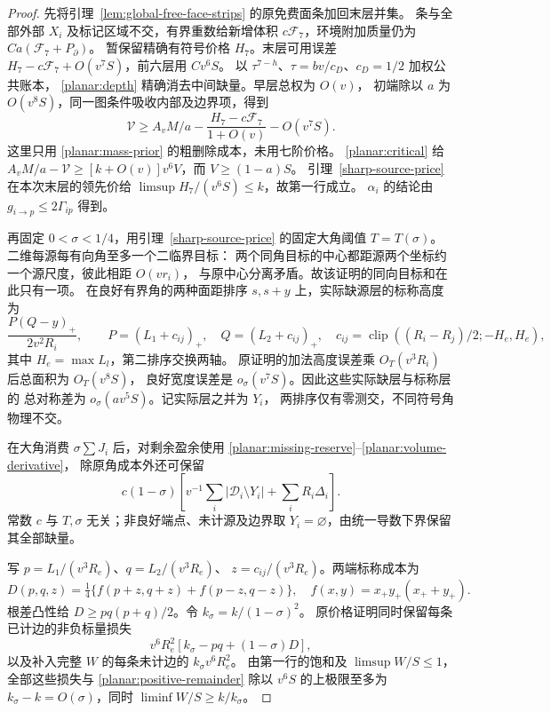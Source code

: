 \begin{proof}
先将引理~\ref{lem:global-free-face-strips} 的原免费面条加回末层并集。
条与全部外部 \(X_i\) 及标记区域不交，有界重数给新增体积
\(c\mathcal F_7\)，环境附加质量仍为 \(Ca(\mathcal F_7+P_\partial)\)。
暂保留精确有符号价格 \(H_7\)。末层可用误差
\(H_7-c\mathcal F_7+O(v^7S)\)，前六层用 \(Cv^6S\)。
以 \(\tau^{7-h}\)、\(\tau=bv/c_D\)、\(c_D=1/2\) 加权公共账本，
\eqref{planar:depth} 精确消去中间缺量。早层总权为 \(O(v)\)，
初端除以 \(a\) 为 \(O(v^8S)\)，同一图条件吸收内部及边界项，得到
\[
 \mathcal V\ge A_vM/a-
   \frac{H_7-c\mathcal F_7}{1+O(v)}-O(v^7S).
\]
这里只用 \eqref{planar:mass-prior} 的粗删除成本，未用七阶价格。
\eqref{planar:critical} 给
\(A_vM/a-\mathcal V\ge[k+O(v)]v^6V\)，而 \(V\ge(1-a)S\)。
引理~\ref{sharp-source-price} 在本次末层的领先价给
\(\limsup H_7/(v^6S)\le k\)，故第一行成立。
\(\alpha_i\) 的结论由 \(g_{i\to p}\le2\Gamma_{ip}\) 得到。

再固定 \(0<\sigma<1/4\)，用引理~\ref{sharp-source-price} 的固定大角阈值
\(T=T(\sigma)\)。二维每源每有向角至多一个二临界目标：
两个同角目标的中心都距源两个坐标约一个源尺度，彼此相距 \(O(vr_i)\)，
与原中心分离矛盾。故该证明的同向目标和在此只有一项。
在良好有界角的两种面距排序 \(s,s+y\) 上，实际缺源层的标称高度为
\[
 \frac{P(Q-y)_+}{2v^2R_i},\qquad
 P=(L_1+c_{ij})_+,\quad Q=(L_2+c_{ij})_+,\quad
 c_{ij}=\operatorname{clip}((R_i-R_j)/2; -H_e,H_e),
\]
其中 \(H_e=\max L_l\)，第二排序交换两轴。
原证明的加法高度误差乘 \(O_T(v^3R_i)\) 后总面积为 \(O_T(v^8S)\)，
良好宽度误差是 \(o_\sigma(v^7S)\)。因此这些实际缺层与标称层的
总对称差为 \(o_\sigma(av^5S)\)。记实际层之并为 \(Y_i\)，
两排序仅有零测交，不同符号角物理不交。

在大角消费 \(\sigma\sum J_i\) 后，对剩余盈余使用
\eqref{planar:missing-reserve}--\eqref{planar:volume-derivative}，
除原角成本外还可保留
\begin{equation}\label{planar:positive-remainder}
 c(1-\sigma)\left[
 v^{-1}\sum_i|\mathscr D_i\setminus Y_i|+\sum_iR_i\Delta_i\right].
\end{equation}
常数 \(c\) 与 \(T,\sigma\) 无关；非良好端点、未计源及边界取
\(Y_i=\varnothing\)，由统一导数下界保留其全部缺量。

写 \(p=L_1/(v^3R_e)\)、\(q=L_2/(v^3R_e)\)、
\(z=c_{ij}/(v^3R_e)\)。两端标称成本为
\[
 D(p,q,z)=\tfrac14\{f(p+z,q+z)+f(p-z,q-z)\},\quad
 f(x,y)=x_+y_+(x_++y_+).
\]
根差凸性给 \(D\ge pq(p+q)/2\)。令 \(k_\sigma=k/(1-\sigma)^2\)。
原价格证明同时保留每条已计边的非负标量损失
\[
 v^6R_e^2[k_\sigma-pq+(1-\sigma)D],
\]
以及补入完整 \(W\) 的每条未计边的 \(k_\sigma v^6R_e^2\)。
由第一行的饱和及 \(\limsup W/S\le1\)，全部这些损失与
\eqref{planar:positive-remainder} 除以 \(v^6S\) 的上极限至多为
\(k_\sigma-k=O(\sigma)\)，同时 \(\liminf W/S\ge k/k_\sigma\)。


\end{proof}
